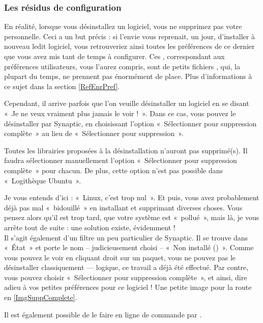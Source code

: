 {\subsubsection{Les résidus de configuration}
En réalité, lorsque vous désinstallez un logiciel, vous ne supprimez pas votre  personnelle. Ceci a un but précis : si l'envie vous reprenait, un jour, d'installer à nouveau ledit logiciel, vous retrouveriez ainsi toutes les préférences de ce dernier que vous avez mis tant de temps à configurer. Ces , correspondant aux préférences utilisateurs, vous l'aurez compris, sont de petits fichiers , qui, la plupart du temps, ne prennent pas énormément de place. Plus d'informations à ce sujet dans la section \ref{RefEnrPref}.\par
Cependant, il arrive parfois que l'on veuille désinstaller un logiciel en se disant «~Je ne veux vraiment plus jamais le voir !~». Dans ce cas, vous pouvez le désinstaller par Synaptic, en choisissant l'option «~Sélectionner pour suppression complète~» au lieu de «~Sélectionner pour suppression~».
\begin{attention}
Toutes les librairies proposées à la désinstallation n'auront pas  supprimé(s). Il faudra sélectionner manuellement l'option «~Sélectionner pour suppression complète~» pour chacun. De plus, cette option n'est pas possible dans «~Logithèque Ubuntu~».
\end{attention}\par
Je vous entends d'ici : «~Linux, c'est trop nul~». Et puis, vous avez probablement déjà pas mal «~bidouillé~» en installant et supprimant diverses choses. Vous pensez alors qu'il est trop tard, que votre système est «~pollué~», mais là, je vous arrête tout de suite : une solution existe, évidemment !\\
Il s'agit également d'un filtre un peu particulier de Synaptic. Il se trouve dans «~État~» et porte le nom -- judicieusement choisi -- «~Non installé ()~». Comme vous pouvez le voir en cliquant droit sur un paquet, vous ne pouvez pas le désinstaller classiquement --- logique, ce travail a déjà été effectué. Par contre, vous pouvez choisir «~Sélectionner pour suppression complète~», et ainsi, dire adieu à vos petites préférences pour ce logiciel ! Une petite image pour la route en \ref{ImgSuppComplete}.
\begin{nota}
Il est également possible de le faire en ligne de commande par  .
\end{nota}
}
